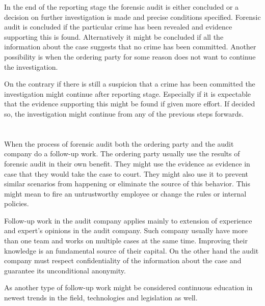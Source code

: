 In the end of the reporting stage the forensic audit is either concluded or a decision on further investigation is made and precise conditions specified. Forensic audit is concluded if the particular crime has been revealed and evidence supporting this is found. Alternatively it might be concluded if all the information about the case suggests that no crime has been committed. Another possibility is when the ordering party for some reason does not want to continue the investigation. 

On the contrary if there is still a suspicion that a crime has been committed the investigation might continue after reporting stage. Especially if it is expectable that the evidence supporting this might be found if given more effort. If decided so, the investigation might continue from any of the previous steps forwards. 


\section{}

When the process of forensic audit both the ordering party and the audit company do a follow-up work. The ordering party usually use the results of forensic audit in their own benefit. They might use the evidence as evidence in case that they would take the case to court. They might also use it to prevent similar scenarios from happening or eliminate the source of this behavior. This might mean to fire an untrustworthy employee or change the rules or internal policies. 

Follow-up work in the audit company applies mainly to extension of experience and expert's opinions in the audit company. Such company usually have more than one team and works on multiple cases at the same time. Improving their knowledge is an fundamental source of their capital. On the other hand the audit company must respect confidentiality of the information about the case and guarantee its unconditional anonymity.

As another type of follow-up work might be considered continuous education in newest trends in the field, technologies and legislation as well.

\colorbox{green}{}

